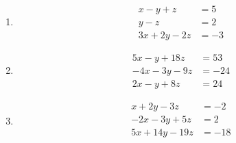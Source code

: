 \documentclass[11pt]{article}
\begin{document}
\begin{enumerate}
  \begin{enumerate}
  \item   \begin{align*}
    x-y+z&=5\\
     y-z&=2\\
    3x+2y-2z&=-3
  \end{align*}
\item   \begin{align*}
    5x-y+18z&=53\\
-4x-3y-9z&=-24\\
2x-y+8z&=24
  \end{align*}


\item 
  \begin{align*}
x+2y-3z&=-2\\
-2x-3y+5z&=2\\
5x+14y-19z&=-18\\
  \end{align*}
\end{enumerate}
\end{enumerate}
\end{document}
